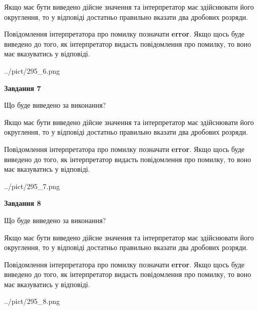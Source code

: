 \documentclass[12pt, ukrainian]{article}
\begin{document}
{\begin {Large}
Якщо має бути виведено дійсне значення та інтерпретатор має здійснювати його округлення, 
то у відповіді достатньо правильно вказати два дробових розряди.

Повідомлення інтерпретатора про помилку позначати \textbf{error}.
Якщо щось буде виведено до того, як інтерпретатор видасть повідомлення про помилку, 
то воно має вказуватись у відповіді. \par

\begin{center}
	{../pict/295_6.png}
\end{center}
\newpage

{\begin {center}\textbf{Завдання 7}\end {center}}\par
Що буде виведено за виконання? \par

Якщо має бути виведено дійсне значення та інтерпретатор має здійснювати його округлення, 
то у відповіді достатньо правильно вказати два дробових розряди.

Повідомлення інтерпретатора про помилку позначати \textbf{error}.
Якщо щось буде виведено до того, як інтерпретатор видасть повідомлення про помилку, 
то воно має вказуватись у відповіді. \par

\begin{center}
	{../pict/295_7.png}
\end{center}
\newpage

{\begin {center}\textbf{Завдання 8}\end {center}}\par
Що буде виведено за виконання? \par

Якщо має бути виведено дійсне значення та інтерпретатор має здійснювати його округлення, 
то у відповіді достатньо правильно вказати два дробових розряди.

Повідомлення інтерпретатора про помилку позначати \textbf{error}.
Якщо щось буде виведено до того, як інтерпретатор видасть повідомлення про помилку, 
то воно має вказуватись у відповіді. \par

\begin{center}
	{../pict/295_8.png}
\end{center}
\newpage


\end{Large}}
\end{document}
